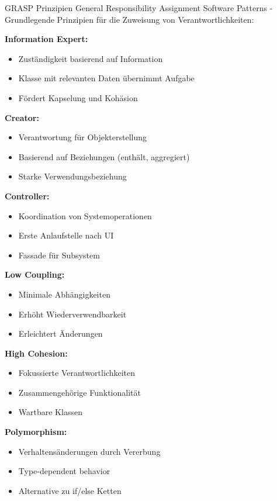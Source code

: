 \begin{concept}{GRASP Prinzipien}
General Responsibility Assignment Software Patterns - Grundlegende Prinzipien für die Zuweisung von Verantwortlichkeiten:

\textbf{Information Expert:}
\begin{itemize}
    \item Zuständigkeit basierend auf Information
    \item Klasse mit relevanten Daten übernimmt Aufgabe
    \item Fördert Kapselung und Kohäsion
\end{itemize}

\textbf{Creator:}
\begin{itemize}
    \item Verantwortung für Objekterstellung
    \item Basierend auf Beziehungen (enthält, aggregiert)
    \item Starke Verwendungsbeziehung
\end{itemize}

\textbf{Controller:}
\begin{itemize}
    \item Koordination von Systemoperationen
    \item Erste Anlaufstelle nach UI
    \item Fassade für Subsystem
\end{itemize}

\textbf{Low Coupling:}
\begin{itemize}
    \item Minimale Abhängigkeiten
    \item Erhöht Wiederverwendbarkeit
    \item Erleichtert Änderungen
\end{itemize}

\textbf{High Cohesion:}
\begin{itemize}
    \item Fokussierte Verantwortlichkeiten
    \item Zusammengehörige Funktionalität
    \item Wartbare Klassen
\end{itemize}

\textbf{Polymorphism:}
\begin{itemize}
    \item Verhaltensänderungen durch Vererbung
    \item Type-dependent behavior
    \item Alternative zu if/else Ketten
\end{itemize}


\end{concept}
